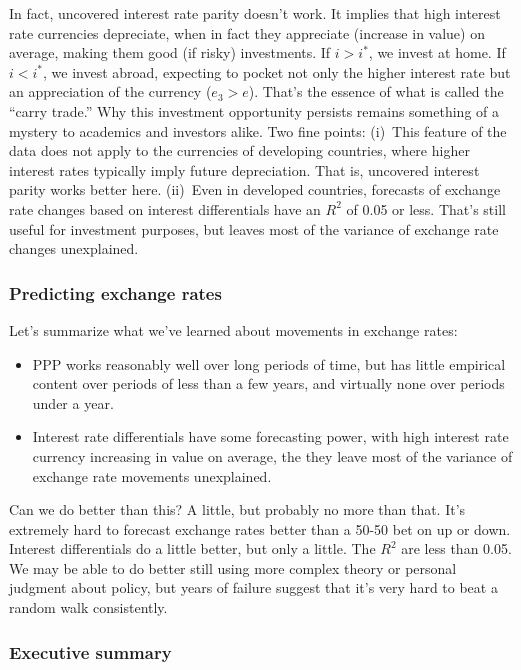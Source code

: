 \documentclass[letterpaper,12pt]{article}
\begin{document}
In fact, uncovered interest rate parity doesn't work.
It implies that high interest rate currencies depreciate,
when in fact they appreciate (increase in value) on average,
making them good (if risky) investments.
If $i>i^*$, we invest at home.  If $i<i^*$, we invest abroad,
expecting to pocket not only the higher interest rate but
an appreciation of the currency ($e_3>e$).
That's the essence of what is called the ``carry trade.'' 
Why this investment opportunity persists remains something of a mystery to
academics and investors alike.
Two fine points:  (i)~This feature of the data does not apply to
the currencies of developing countries, where higher interest rates
typically imply future depreciation.
That is, uncovered interest parity works better here.  
(ii)~Even in developed countries, forecasts of exchange rate changes based on interest differentials have an $R^2$ of 0.05 or less.
That's still useful for investment purposes,
but leaves most of the variance of exchange rate changes unexplained.


\subsubsection*{Predicting exchange rates}

Let's summarize what we've learned about movements in exchange rates:
%
\begin{itemize}
\item PPP works reasonably well over long periods of time,
but has little empirical content over periods of less than a few years,
and virtually none over periods under a year.

\item Interest rate differentials have some forecasting power,
with high interest rate currency increasing in value on average,
the they leave most of the variance of exchange rate movements
 unexplained.
\end{itemize}
%
Can we do better than this?
A little, but probably no more than that.
It's extremely hard to forecast exchange rates better than
a 50-50 bet on up or down.
Interest differentials do a little better, but only a little.
The $R^2$ are less than 0.05.
We may be able to do better still
using more complex theory or personal judgment about policy,
but years of failure suggest that
it's very hard to beat a random walk consistently.



\subsubsection*{Executive summary}
\end{document}
